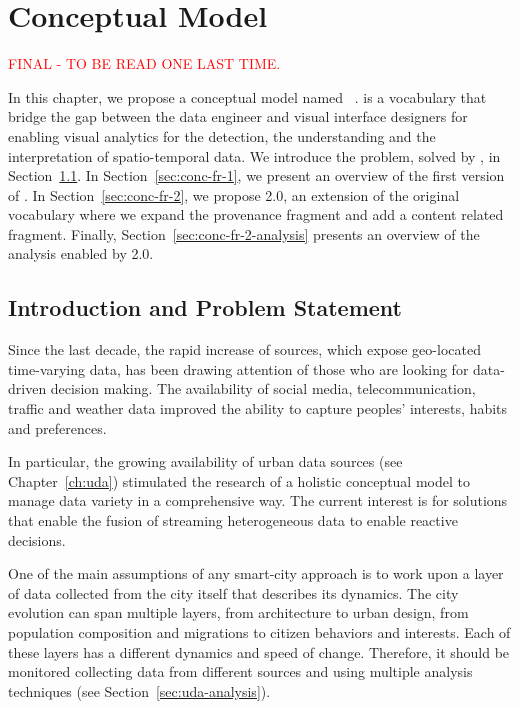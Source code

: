 \chapter{Conceptual Model}\label{ch:conceptual}

\textcolor{red}{FINAL - TO BE READ ONE LAST TIME.}

In this chapter, we propose a conceptual model named \frappe{}~\cite{DBLP:conf/semweb/BalduiniV15}. \frappe{} is a vocabulary that bridge the gap between the data engineer and visual interface designers for enabling visual analytics for the detection, the understanding and the interpretation of spatio-temporal data.
We introduce the problem, solved by \frappe{}, in Section~\ref{sec:conc-intro}.
In Section~\ref{sec:conc-fr-1}, we present an overview of the first version of \frappe{}.
In Section~\ref{sec:conc-fr-2}, we propose \frappe{} 2.0, an extension of the original vocabulary where we expand the provenance fragment and add a content related fragment.
Finally, Section~\ref{sec:conc-fr-2-analysis} presents an overview of the analysis enabled by \frappe{} 2.0.

\section{Introduction and Problem Statement}\label{sec:conc-intro}
Since the last decade, the rapid increase of sources, which expose geo-located time-varying data, has been drawing attention of those who are looking for data-driven decision making. 
The availability of social media, telecommunication, traffic and weather data improved the ability to capture peoples' interests, habits and preferences.

In particular, the growing availability of urban data sources (see Chapter~\ref{ch:uda}) stimulated the research of a holistic conceptual model to manage data variety in a comprehensive way. The current interest is for solutions that enable the fusion of streaming heterogeneous data to enable reactive decisions.

One of the main assumptions of any smart-city approach is to work upon a layer of data collected from the city itself that describes its dynamics. The city evolution can span multiple layers, from architecture to urban design, from population composition and migrations to citizen behaviors and interests. Each of these layers has a different dynamics and speed of change.
Therefore, it should be monitored collecting data from different sources and using multiple analysis techniques (see Section~\ref{sec:uda-analysis}). 

